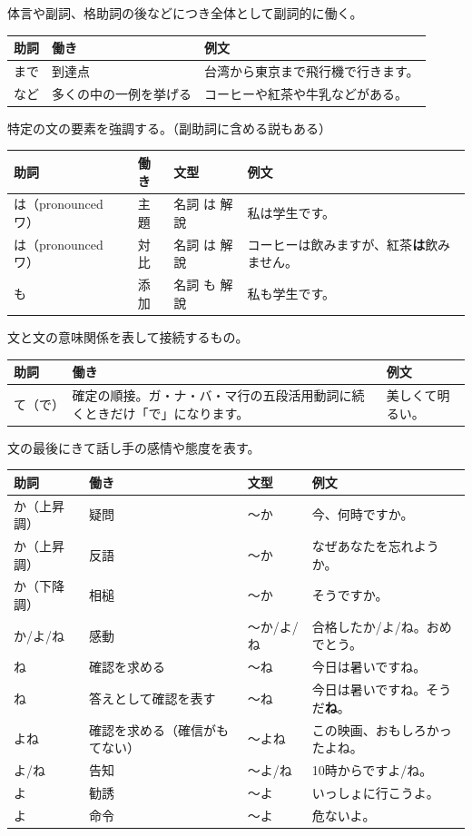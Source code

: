 \documentclass[a4paper,12pt]{article}
\begin{document}
体言や副詞、格助詞の後などにつき全体として副詞的に働く。
\begin{longtable}[c]{|C{0.1\textwidth}|C{0.2\textwidth}|C{0.5\textwidth}|}
\hline
助詞 & 働き & 例文 \\\hline\endhead
まで & 到達点 & 台湾から東京まで飛行機で行きます。 \\\hline
など & 多くの中の一例を挙げる & コーヒーや紅茶や牛乳などがある。 \\\hline
\end{longtable}
特定の文の要素を強調する。（副助詞に含める説もある）
\begin{longtable}[c]{|C{0.1\textwidth}|C{0.2\textwidth}|C{0.25\textwidth}|C{0.25\textwidth}|}
\hline
助詞 & 働き & 文型 & 例文 \\\hline\endhead
は（pronounced ワ） & 主題 & 名詞 は 解說 & 私は学生です。 \\\hline
は（pronounced ワ） & 対比 & 名詞 は 解說 & コーヒーは飲みますが、紅茶\textbf{は}飲みません。 \\\hline
も & 添加 & 名詞 も 解說 & 私も学生です。 \\\hline
\end{longtable}
文と文の意味関係を表して接続するもの。
\begin{longtable}[c]{|C{0.1\textwidth}|C{0.2\textwidth}|C{0.5\textwidth}|}
\hline
助詞 & 働き & 例文 \\\hline\endhead
て（で） & 確定の順接。ガ・ナ・バ・マ行の五段活用動詞に続くときだけ「で」になります。 & 美しくて明るい。 \\\hline
\end{longtable}
文の最後にきて話し手の感情や態度を表す。
\begin{longtable}[c]{|C{0.1\textwidth}|C{0.2\textwidth}|C{0.25\textwidth}|C{0.25\textwidth}|}
\hline
助詞 & 働き & 文型 & 例文 \\\hline\endhead
か（上昇調） & 疑問 & 〜か & 今、何時ですか。 \\\hline
か（上昇調） & 反語 & 〜か & なぜあなたを忘れようか。 \\\hline
か（下降調） & 相槌 & 〜か & そうですか。 \\\hline
か/よ/ね & 感動 & 〜か/よ/ね & 合格したか/よ/ね。おめでとう。 \\\hline
ね & 確認を求める & 〜ね & 今日は暑いですね。 \\\hline
ね & 答えとして確認を表す & 〜ね & 今日は暑いですね。そうだ\textbf{ね}。 \\\hline
よね & 確認を求める（確信がもてない） & 〜よね & この映画、おもしろかったよね。 \\\hline
よ/ね & 告知 & 〜よ/ね & 10時からですよ/ね。 \\\hline
よ & 勧誘 & 〜よ & いっしょに行こうよ。 \\\hline
よ & 命令 & 〜よ & 危ないよ。 \\\hline
\end{longtable}
\end{document}
